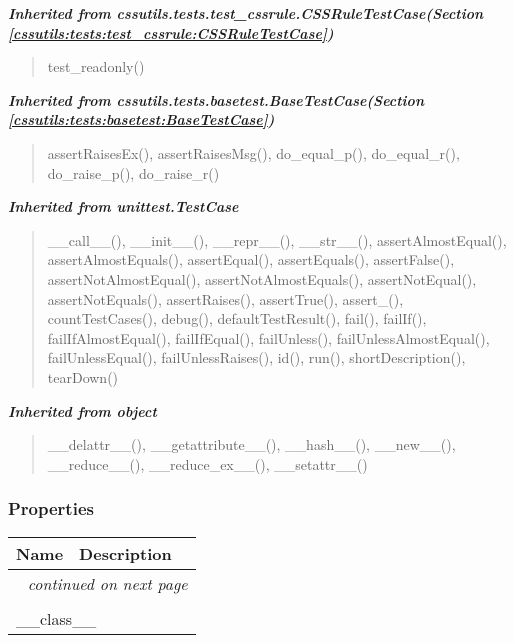 \large{\textbf{\textit{Inherited from cssutils.tests.test\_cssrule.CSSRuleTestCase\textit{(Section \ref{cssutils:tests:test_cssrule:CSSRuleTestCase})}}}}

\begin{quote}
test\_readonly()
\end{quote}

\large{\textbf{\textit{Inherited from cssutils.tests.basetest.BaseTestCase\textit{(Section \ref{cssutils:tests:basetest:BaseTestCase})}}}}

\begin{quote}
assertRaisesEx(), assertRaisesMsg(), do\_equal\_p(), do\_equal\_r(), do\_raise\_p(), do\_raise\_r()
\end{quote}

\large{\textbf{\textit{Inherited from unittest.TestCase}}}

\begin{quote}
\_\_call\_\_(), \_\_init\_\_(), \_\_repr\_\_(), \_\_str\_\_(), assertAlmostEqual(), assertAlmostEquals(), assertEqual(), assertEquals(), assertFalse(), assertNotAlmostEqual(), assertNotAlmostEquals(), assertNotEqual(), assertNotEquals(), assertRaises(), assertTrue(), assert\_(), countTestCases(), debug(), defaultTestResult(), fail(), failIf(), failIfAlmostEqual(), failIfEqual(), failUnless(), failUnlessAlmostEqual(), failUnlessEqual(), failUnlessRaises(), id(), run(), shortDescription(), tearDown()
\end{quote}

\large{\textbf{\textit{Inherited from object}}}

\begin{quote}
\_\_delattr\_\_(), \_\_getattribute\_\_(), \_\_hash\_\_(), \_\_new\_\_(), \_\_reduce\_\_(), \_\_reduce\_ex\_\_(), \_\_setattr\_\_()
\end{quote}


  \subsubsection{Properties}

    \vspace{-1cm}
\hspace{\varindent}\begin{longtable}{|p{\varnamewidth}|p{\vardescrwidth}|l}
\cline{1-2}
\cline{1-2} \centering \textbf{Name} & \centering \textbf{Description}& \\
\cline{1-2}
\endhead\cline{1-2}\multicolumn{3}{r}{\small\textit{continued on next page}}\\\endfoot\cline{1-2}
\endlastfoot\multicolumn{2}{|l|}{\textit{Inherited from object}}\\
\multicolumn{2}{|p{\varwidth}|}{\raggedright \_\_class\_\_}\\
\cline{1-2}
\end{longtable}

